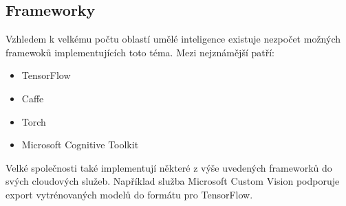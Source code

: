 \subsection{Frameworky}
Vzhledem k velkému počtu oblastí umělé inteligence existuje nezpočet možných framewoků implementujících toto téma. Mezi nejznámější patří:
\begin{itemize}
	\item TensorFlow
	\item Caffe
	\item Torch
	\item Microsoft Cognitive Toolkit
\end{itemize}

Velké společnosti také implementují některé z výše uvedených frameworků do svých cloudových služeb. Například služba Microsoft Custom Vision podporuje export vytrénovaných modelů do formátu pro TensorFlow.